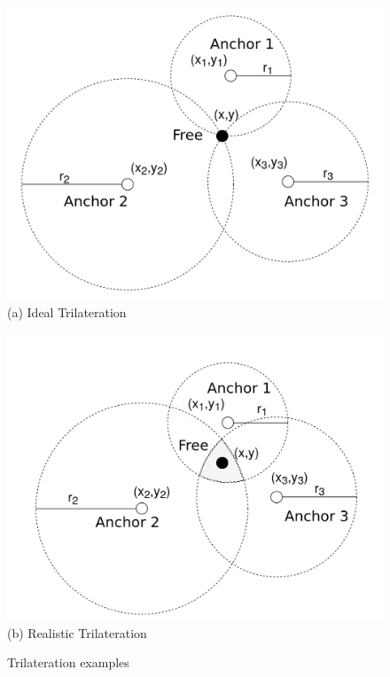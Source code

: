 \begin{figure} [H]
	\centering
		\begin{minipage}{.5\textwidth}
			\centering
			\includegraphics[width=\linewidth]{../Photos/Trilateration-ideal.png}
			{(a) Ideal Trilateration}
		\end{minipage}%
		\begin{minipage}{.5\textwidth}
			\centering
			\includegraphics[width=\linewidth]{../Photos/Trilateration-actual.png}
			{(b) Realistic Trilateration}
		\end{minipage}
    \hfill \break
    \decoRule
    \caption[Trilateration examples]{Trilateration examples}
    \label{fig:Trilateration-examples}
\end{figure}

